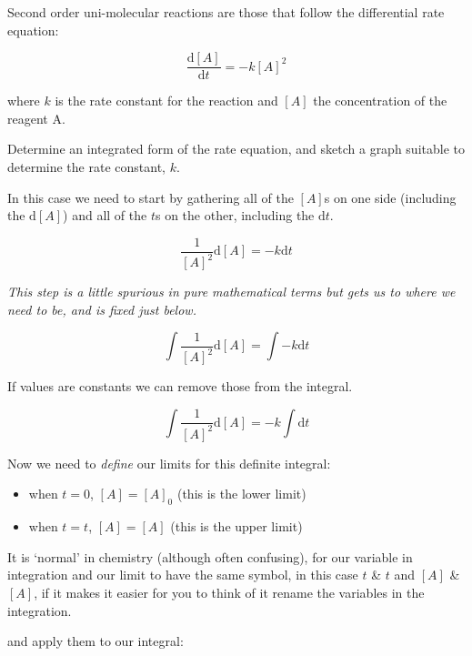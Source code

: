 \documentclass[
]{book}
\providecommand{\tightlist}{%
  \setlength{\itemsep}{0pt}\setlength{\parskip}{0pt}}
\begin{document}
Second order uni-molecular reactions are those that follow the differential rate equation:

\begin{equation*}
\frac{\textrm{d}[A]}{\textrm{d}t} = - k [A]^2
\end{equation*}

where \(k\) is the rate constant for the reaction and \([A]\) the concentration of the reagent A.

Determine an integrated form of the rate equation, and sketch a graph suitable to determine the rate constant, \(k\).

In this case we need to start by gathering all of the \([A]\)s on one side (including the \(\textrm{d}[A]\)) and all of the \(t\)s on the other, including the \(\textrm{d}t\).

\begin{equation*}
\frac{1}{[A]^2} \textrm{d}[A]= - k \textrm{d}t
\end{equation*}

\emph{This step is a little spurious in pure mathematical terms but gets us to where we need to be, and is fixed just below.}

\begin{equation*}
\int \frac{1}{[A]^2} \textrm{d}[A]= \int - k \textrm{d}t
\end{equation*}

If values are constants we can remove those from the integral.

\begin{equation*}
\int \frac{1}{[A]^2} \textrm{d}[A]=  - k \int \textrm{d}t
\end{equation*}

Now we need to \emph{define} our limits for this definite integral:

\begin{itemize}
\tightlist
\item
  when \(t = 0\), \([A] = [A]_0\) (this is the lower limit)
\item
  when \(t = t\), \([A] = [A]\) (this is the upper limit)
\end{itemize}

It is `normal' in chemistry (although often confusing), for our variable in integration and our limit to have the same symbol, in this case \(t\) \& \(t\) and \([A]\) \& \([A]\), if it makes it easier for you to think of it rename the variables in the integration.

and apply them to our integral:
\end{document}
